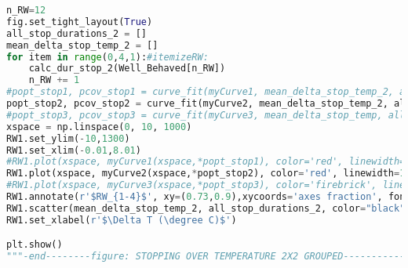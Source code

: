 \begin{lstlisting}[language=Python, basicstyle=\tiny, frame=single, keywordstyle=\color{teal}, commentstyle=\color{olive}, stringstyle=\color{red}]
n_RW=12
fig.set_tight_layout(True)
all_stop_durations_2 = []
mean_delta_stop_temp_2 = []
for item in range(0,4,1):#itemizeRW:
    calc_dur_stop_2(Well_Behaved[n_RW])
    n_RW += 1
#popt_stop1, pcov_stop1 = curve_fit(myCurve1, mean_delta_stop_temp_2, all_stop_durations_2, maxfev = 200000, p0=(0,0))
popt_stop2, pcov_stop2 = curve_fit(myCurve2, mean_delta_stop_temp_2, all_stop_durations_2, maxfev = 200000, p0=(0,0))
#popt_stop3, pcov_stop3 = curve_fit(myCurve3, mean_delta_stop_temp, all_stop_durations, maxfev = 200000, p0=(0,0,0))
xspace = np.linspace(0, 10, 1000)
RW1.set_ylim(-10,1300)
RW1.set_xlim(-0.01,8.01)
#RW1.plot(xspace, myCurve1(xspace,*popt_stop1), color='red', linewidth=1.1, linestyle='dashed', label=r'$t_{0}=\tau/(1+(\beta*\Delta T))$')
RW1.plot(xspace, myCurve2(xspace,*popt_stop2), color='red', linewidth=1.1, linestyle='dashdot', label=r'$t_{0}=\tau*e^{-\beta*\Delta T}$')
#RW1.plot(xspace, myCurve3(xspace,*popt_stop3), color='firebrick', linewidth=1.1, label=r'$t_{0}=\tau*(\beta*\DeltaT)^{\gamma}$')
RW1.annotate(r'$RW_{1-4}$', xy=(0.73,0.9),xycoords='axes fraction', fontsize=12)
RW1.scatter(mean_delta_stop_temp_2, all_stop_durations_2, color="black", alpha=0.3)
RW1.set_xlabel(r'$\Delta T (\degree C)$')

plt.show()
"""-end--------figure: STOPPING OVER TEMPERATURE 2X2 GROUPED-----------------"""


\end{lstlisting}
